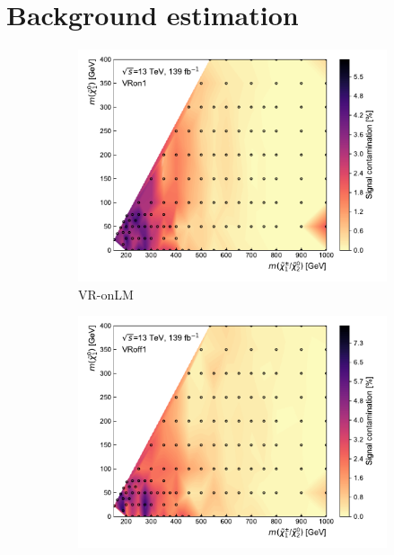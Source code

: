
\ifpdf
\graphicspath{{chapter-background/Figs/Raster/}{chapter-background/Figs/PDF/}{chapter-background/Figs/}}
\else
\graphicspath{{chapter-background/Figs/Vector/}{chapter-background/Figs/}}
\fi

\section{Background estimation}\label{app:background_estimation}
\begin{figure}[H]
	\centering
	\begin{subfigure}[b]{0.5\linewidth}
		\centering\includegraphics[width=1.0\textwidth]{signal_contamination/plot_VRon1}
		\caption{VR-onLM\label{fig:signal_contamination_VRon1}}
	\end{subfigure}\hfill
	\begin{subfigure}[b]{0.5\linewidth}
		\centering\includegraphics[width=1.0\textwidth]{signal_contamination/plot_VRoff1}

\end{subfigure}
\end{figure}
